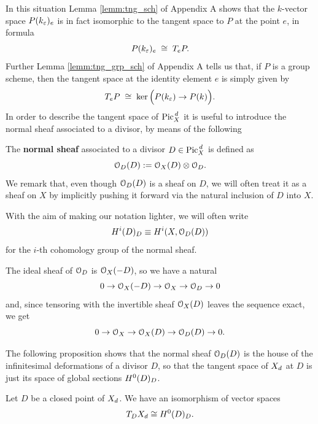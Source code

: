 	In this situation Lemma \ref{lemm:tng_sch} of Appendix A shows that the $k$-vector space $P(k_\varepsilon)_e$ is in fact isomorphic to the tangent space to $P$ at the point $e$, in formula
	$$ P(k_\varepsilon)_e \; \cong \; T_e P. $$
	Further Lemma \ref{lemm:tng_grp_sch} of Appendix A tells us that, if $P$ is a group scheme, then the tangent space at the identity element $e$ is simply given by
	$$ T_e P \;\cong\; \ker \Big( P(k_\varepsilon) \to P(k) \Big). $$
	In order to describe the tangent space of $ \operatorname{Pic}^{\,d}_X$ it is useful to introduce the normal sheaf associated to a divisor, by means of the following 
	\begin{defi}
		The \textbf{normal sheaf} associated to a divisor $D\in  \operatorname{Pic}^{\,d}_X$ is defined as
		$$ \mathcal{O}_D(D) := \mathcal{O}_X(D) \otimes \mathcal{O}_D. $$
		We remark that, even though $\mathcal{O}_D(D)$ is a sheaf on $D$, we will often treat it as a sheaf on $X$ by implicitly pushing it forward via the natural inclusion of $D$ into $X$. 
	\end{defi}
	\begin{notation}
		With the aim of making our notation lighter, we will often write 
		$$ H^i(D)_{D} \equiv H^i(X,\mathcal{O}_D(D))$$ 
		for the $i$-th cohomology group of the normal sheaf.
	\end{notation}
	\begin{rema}\label{rema:div_ses}
		The ideal sheaf of $\mathcal{O}_D$ is $\mathcal{O}_X(-D)$, so we have a natural \ses
		$$ 0 \to \mathcal{O}_X(-D) \to \mathcal{O}_X \to \mathcal{O}_D \to 0 $$
		and, since tensoring with the invertible sheaf $\mathcal{O}_X(D)$ leaves the sequence exact, we get
		$$ 0 \to \mathcal{O}_X \to \mathcal{O}_X(D) \to \mathcal{O}_D(D) \to 0. $$			
	\end{rema}
	The following proposition shows that the normal sheaf $\mathcal{O}_D(D)$ is the house of the infinitesimal deformations of a divisor $D$, so that the tangent space of $X_d$ at $D$ is just its space of global sections $H^0(D)_D$.
	\begin{prop}\label{prop:tgn_div}
		Let $D$ be a closed point of $ X_d$. We have an isomorphism of vector spaces
		$$ T_D X_d \cong H^0(D)_D. $$
	\end{prop}
